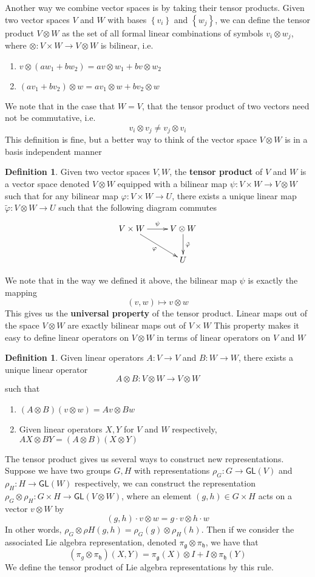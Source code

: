 \documentclass[psamsfonts]{amsart}
\theoremstyle{definition}
\newtheorem{defn}[thm]{Definition}
\theoremstyle{remark}
\newcommand{\GL}{\mathsf{GL}}
\newcommand{\g}{\mathfrak{g}}
\newcommand{\set}[1]{\left\lbrace#1 \right\rbrace}
\begin{document}
Another way we combine vector spaces is by taking their tensor products. Given two vector spaces $V$ and $W$ with bases $\set{v_i}$ and $\set{w_j}$, we can define the tensor product $V \otimes W$ as the set of all formal linear combinations of symbols $v_i \otimes w_j$, where $\otimes: V \times W \to V \otimes W$ is bilinear, i.e.
\begin{enumerate}
\item $v\otimes(aw_1 + bw_2) = av\otimes w_1 + bv\otimes w_2$
\item $(av_1 + bv_2) \otimes w = av_1\otimes w + bv_2\otimes w$
\end{enumerate} 
We note that in the case that $W = V$, that the tensor product of two vectors need not be commutative, i.e.
$$v_i \otimes v_j \neq v_j \otimes v_i $$
This definition is fine, but a better way to think of the vector space $V \otimes W$ is in a basis independent manner
\begin{defn}
Given two vector spaces $V, W$, the \textbf{tensor product} of $V$ and $W$ is a vector space denoted $V \otimes W$ equipped with a bilinear map $\psi: V \times W \to V \otimes W$ such that for any bilinear map $\varphi: V\times W \to U$, there exists a unique linear map $\tilde{\varphi}: V \otimes W \to U$ such that the following diagram commutes
$$\xymatrix{
V \times W  \ar[dr]_\varphi\ar[r]^\psi & V\otimes W \ar[d]^{\tilde{\varphi}}\\
& U
} $$
\end{defn}
We note that in the way we defined it above, the bilinear map $\psi$ is exactly the mapping 
$$(v,w) \mapsto v \otimes w $$
This gives us the \textbf{universal property} of the tensor product. Linear maps out of the space $V \otimes W$ are exactly bilinear maps  out of $V\times W$
This property makes it easy to define linear operators on $V \otimes W$ in terms of linear operators on $V$ and $W$
\begin{defn}
Given linear operators $A: V\to V$ and $B: W\to W$, there exists a unique linear operator
$$A\otimes B: V\otimes W \to V\otimes W $$
such that 
\begin{enumerate}
\item $(A\otimes B)(v \otimes w) = Av\otimes Bw $
\item Given linear operators $X,Y$ for $V$ and $W$ respectively, $AX\otimes BY = (A\otimes B)(X\otimes Y)$
\end{enumerate}
\end{defn}

The tensor product gives us several ways to construct new representations. Suppose we have two groups $G,H$ with representations $\rho_G: G\to \GL(V)$ and $\rho_H: H \to \GL(W)$ respectively, we can construct the representation $\rho_G \otimes \rho_H: G\times H \to \GL(V\otimes W)$, where an element $(g,h) \in G\times H$ acts on a vector $v \otimes W$ by
$$(g,h) \cdot v\otimes w = g\cdot v \otimes h \cdot w $$
In other words, $\rho_G \otimes \rho H(g,h) = \rho_G(g) \otimes \rho_H(h)$.
Then if we consider the associated Lie algebra representation, denoted $\pi_\g \otimes \pi_\mathfrak{h}$, we have that 
$$(\pi_g \otimes \pi_\mathfrak{h})(X,Y) = \pi_\g(X)\otimes I + I\otimes \pi_\mathfrak{h}(Y) $$
We define the tensor product of Lie algebra representations by this rule.
\end{document}
